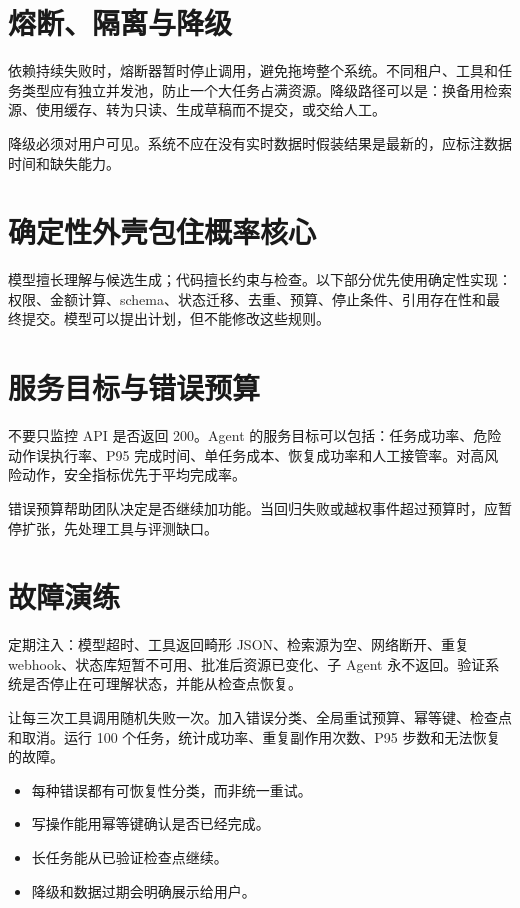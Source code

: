 \section{熔断、隔离与降级}

依赖持续失败时，熔断器暂时停止调用，避免拖垮整个系统。不同租户、工具和任务类型应有独立并发池，防止一个大任务占满资源。降级路径可以是：换备用检索源、使用缓存、转为只读、生成草稿而不提交，或交给人工。

降级必须对用户可见。系统不应在没有实时数据时假装结果是最新的，应标注数据时间和缺失能力。

\section{确定性外壳包住概率核心}

模型擅长理解与候选生成；代码擅长约束与检查。以下部分优先使用确定性实现：权限、金额计算、schema、状态迁移、去重、预算、停止条件、引用存在性和最终提交。模型可以提出计划，但不能修改这些规则。

\section{服务目标与错误预算}

不要只监控 API 是否返回 200。Agent 的服务目标可以包括：任务成功率、危险动作误执行率、P95 完成时间、单任务成本、恢复成功率和人工接管率。对高风险动作，安全指标优先于平均完成率。

错误预算帮助团队决定是否继续加功能。当回归失败或越权事件超过预算时，应暂停扩张，先处理工具与评测缺口。

\section{故障演练}

定期注入：模型超时、工具返回畸形 JSON、检索源为空、网络断开、重复 webhook、状态库短暂不可用、批准后资源已变化、子 Agent 永不返回。验证系统是否停止在可理解状态，并能从检查点恢复。

\begin{practice}
让每三次工具调用随机失败一次。加入错误分类、全局重试预算、幂等键、检查点和取消。运行 100 个任务，统计成功率、重复副作用次数、P95 步数和无法恢复的故障。
\end{practice}

\begin{checkpoint}
\begin{itemize}
  \item \checkbox 每种错误都有可恢复性分类，而非统一重试。
  \item \checkbox 写操作能用幂等键确认是否已经完成。
  \item \checkbox 长任务能从已验证检查点继续。
  \item \checkbox 降级和数据过期会明确展示给用户。
\end{itemize}
\end{checkpoint}

